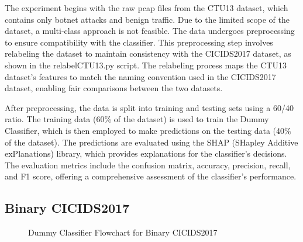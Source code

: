 The experiment begins with the raw pcap files from the CTU13 dataset, which contains only botnet attacks and benign traffic. Due to the limited scope of the dataset, a multi-class approach is not feasible. The data undergoes preprocessing to ensure compatibility with the classifier. This preprocessing step involves relabeling the dataset to maintain consistency with the CICIDS2017 dataset, as shown in the relabelCTU13.py script. The relabeling process maps the CTU13 dataset's features to match the naming convention used in the CICIDS2017 dataset, enabling fair comparisons between the two datasets.

After preprocessing, the data is split into training and testing sets using a 60/40 ratio. The training data (60\% of the dataset) is used to train the Dummy Classifier, which is then employed to make predictions on the testing data (40\% of the dataset). The predictions are evaluated using the SHAP (SHapley Additive exPlanations) library, which provides explanations for the classifier's decisions. The evaluation metrics include the confusion matrix, accuracy, precision, recall, and F1 score, offering a comprehensive assessment of the classifier's performance.

\subsection{Binary CICIDS2017}

\begin{figure}[H]
\centering
{}
\caption{Dummy Classifier Flowchart for Binary CICIDS2017}\label{fig:DummyRandomFlowBinaryCICIDS2017}
\end{figure}

